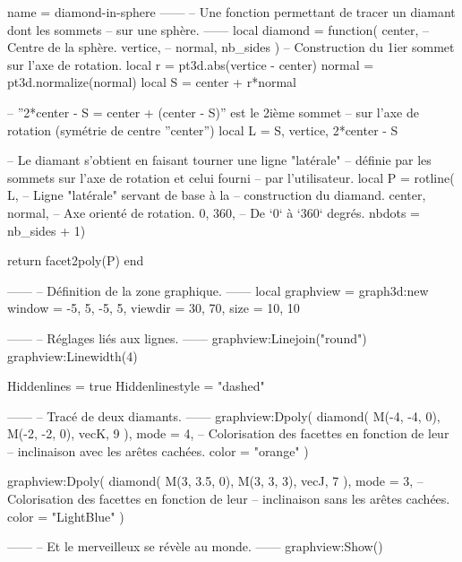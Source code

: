 \documentclass{standalone}
\begin{document}
\begin{luadraw}{name = diamond-in-sphere}
------
-- Une fonction permettant de tracer un diamant dont les sommets
-- sur une sphère.
------
local diamond = function(
  center,   -- Centre de la sphère.
  vertice,  --
  normal,
  nb_sides
)
-- Construction du 1ier sommet sur l'axe de rotation.
  local r = pt3d.abs(vertice - center)
  normal  = pt3d.normalize(normal)
  local S = center + r*normal

-- ''2*center - S = center + (center - S)'' est le 2ième sommet
-- sur l'axe de rotation (symétrie de centre ''center'')
  local L = {S, vertice, 2*center - S}

-- Le diamant s'obtient en faisant tourner une ligne "latérale"
-- définie par les sommets sur l'axe de rotation et celui fourni
-- par l'utilisateur.
  local P = rotline(
    L,                 -- Ligne "latérale" servant de base à la
                       -- construction du diamand.
    {center, normal},  -- Axe orienté de rotation.
    0, 360,            -- De `0` à `360` degrés.
    {nbdots = nb_sides + 1})

  return facet2poly(P)
end

------
-- Définition de la zone graphique.
------
local graphview = graph3d:new{
  window  = {-5, 5, -5, 5},
  viewdir = {30, 70},
  size    = {10, 10}
}

------
-- Réglages liés aux lignes.
------
graphview:Linejoin("round")
graphview:Linewidth(4)

Hiddenlines     = true
Hiddenlinestyle = "dashed"

------
-- Tracé de deux diamants.
------
graphview:Dpoly(
  diamond(
    M(-4, -4, 0), M(-2, -2, 0), vecK,
    9
  ),
  {
    mode  = 4,  -- Colorisation des facettes en fonction de leur
                -- inclinaison avec les arêtes cachées.
    color = "orange"
  })

graphview:Dpoly(
  diamond(
    M(3, 3.5, 0), M(3, 3, 3), vecJ,
    7
  ),
  {
    mode  = 3,  -- Colorisation des facettes en fonction de leur
                -- inclinaison sans les arêtes cachées.
    color = "LightBlue"
  })

------
-- Et le merveilleux se révèle au monde.
------
graphview:Show()
\end{luadraw}
\end{document}
